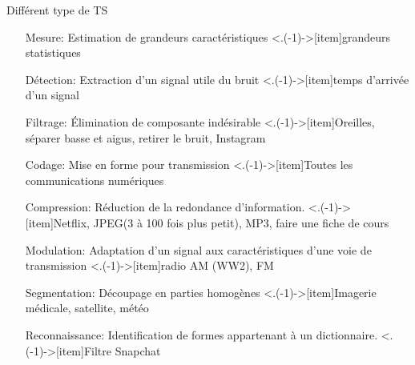 \documentclass{beamer}
\begin{document}
\begin{frame}{Différent type de TS}
  \setlength{\leftmargini}{2.5cm}         %
  \begin{itemize}
    \item[Mesure:\pause] Estimation de grandeurs caractéristiques\pause
    \note<.(-1)->[item]{grandeurs statistiques}
    \item[Détection:\pause] Extraction d'un signal utile du bruit\pause
    \note<.(-1)->[item]{temps d'arrivée d'un signal}
    \item[Filtrage:\pause] Élimination de composante indésirable\pause
    \note<.(-1)->[item]{Oreilles, séparer basse et aigus, retirer le bruit, Instagram}
    \item[Codage:\pause] Mise en forme pour transmission\pause
    \note<.(-1)->[item]{Toutes les communications numériques}
    \item[Compression:\pause] Réduction de la redondance d'information.\pause
    \note<.(-1)->[item]{Netflix, JPEG(3 à 100 fois plus petit), MP3, faire une fiche de cours}
    \item[Modulation:\pause] Adaptation d'un signal aux caractéristiques d'une voie de transmission\pause
    \note<.(-1)->[item]{radio AM (WW2), FM }
    \item[Segmentation:\pause] Découpage en parties homogènes\pause
    \note<.(-1)->[item]{Imagerie médicale, satellite, météo}
    \item[Reconnaissance:\pause] Identification de formes appartenant à un dictionnaire.\pause
    \note<.(-1)->[item]{Filtre Snapchat}
  \end{itemize}
\end{frame}
\end{document}
